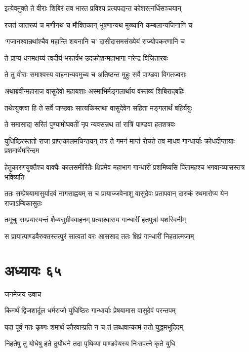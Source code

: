 \twolineshloka
{इत्येवमुक्ते ते वीराः शिबिरं तव भारत}
{प्रविश्य प्रत्यपद्यन्त कोशरत्नर्धिसञ्चयान्}


\twolineshloka
{रजतं जातरूपं च मणीनथ च मौक्तिकान्}
{भूषणान्यथ मुख्यानि कम्बलान्यजिनानि च}


\twolineshloka
{`गजानश्वान्रथांश्चैव महान्ति शयनानि च'}
{दासीदासमसंख्येयं राज्योपकरणानि च}


\twolineshloka
{ते प्राप्य धनमक्षय्यं त्वदीयं भरतर्षभ}
{उदक्रोशन्महाभागा नरेन्द्र विजितारयः}


\twolineshloka
{ते तु वीराः समाश्वस्य वाहनान्यवमुच्य च}
{अतिष्ठन्त मुहुः सर्वे पाण्डवा विगतज्वराः}


\twolineshloka
{अथाब्रवीन्महाराज वासुदेवो महायशाः}
{अस्माभिर्मङ्गलार्थाय वस्तव्यं शिबिराद्बहिः}


\twolineshloka
{तथेत्युक्त्वा हि ते सर्वे पाण्डवाः सात्यकिस्तथा}
{वासुदेवेन सहिता मङ्गलार्थं बहिर्ययुः}


\twolineshloka
{ते समासाद्य सरितं पुण्यामोघवतीं नृप}
{न्यवसन्नथ तां रात्रिं पाण्डवा हतशत्रवः}


युधिष्ठिरस्ततो राजा प्राप्तकालमचिन्तयन्
\twolineshloka
{तत्र ते गमनं माप्तं रोचते तव माधव}
{गान्धार्याः क्रोधदीप्तायाः प्रशमार्थमरिन्दम}


\threelineshloka
{हेतुकारणयुक्तैश्च वाक्यैः कालसमीरितैः}
{क्षिप्रमेव महाभाग गान्धारीं प्रशमिष्यसि}
{पितामहश्च भगवान्व्यासस्तत्र भविष्यति}


ततः सम्प्रेषयामासुर्यादवं नागसाह्वयम्
\twolineshloka
{स च प्रायाज्जवेनाशु वासुदेवः प्रतापवान्}
{दारुकं रथमारोप्य येन राजाऽम्बिकासुतः}


\twolineshloka
{तमूचुः सम्प्रयास्यन्तं शैब्यसुग्रीववाहनम्}
{प्रत्याश्वासय गान्धारीं हतपुत्रां यशस्विनीम्}


\twolineshloka
{स प्रायात्पाण्डवैरुक्तस्तत्पुरं सात्वतां वरः}
{आससाद ततः क्षिप्रं गान्धारीं निहतात्मजाम्}


\chapter{अध्यायः ६५}
\twolineshloka
{जनमेजय उवाच}
{}


\twolineshloka
{किमर्थं द्विजशार्दूल धर्मराजो युधिष्ठिरः}
{गान्धार्याः प्रेषयामास वासुदेवं परन्तपम्}


\twolineshloka
{यदा पूर्वं गतः कृष्णः शमार्थं कौरवान्प्रति}
{न च तं लब्धवान्कामं ततो युद्धमभूदिदम्}


\twolineshloka
{निहतेषु तु योधेषु हते दुर्योधने तदा}
{पृथिव्यां पाण्डवेयस्य निःसपत्ने कृते युधि}


